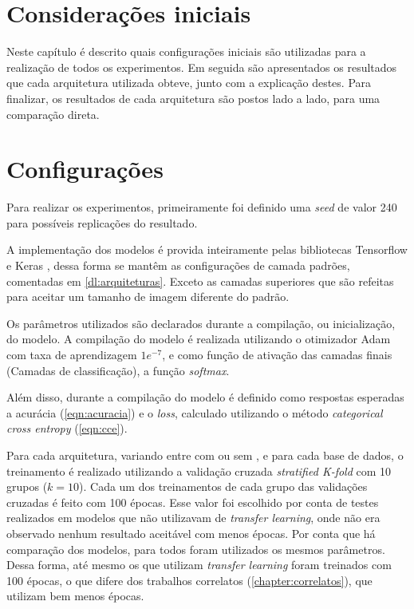 \section{Considerações iniciais}
Neste capítulo é descrito quais configurações iniciais são utilizadas para a realização de todos os experimentos.
Em seguida são apresentados os resultados que cada arquitetura utilizada obteve, junto com a explicação destes.
Para finalizar, os resultados de cada arquitetura são postos lado a lado, para uma comparação direta.

\section{Configurações}
Para realizar os experimentos, primeiramente foi definido uma \textit{seed} de valor 240 para possíveis replicações do resultado.

A implementação dos modelos é provida inteiramente pelas bibliotecas Tensorflow \cite{tensorflow2015-whitepaper} e Keras \cite{chollet2015keras}, dessa forma se mantêm as configurações de camada padrões, comentadas em \autoref{dl:arquiteturas}. 
Exceto as camadas superiores que são refeitas para aceitar um tamanho de imagem diferente do padrão.

Os parâmetros utilizados são declarados durante a compilação, ou inicialização, do modelo.
A compilação do modelo é realizada utilizando o otimizador Adam \cite{kingma2014adam} com taxa de aprendizagem $1e^{-7}$, e como função de ativação das camadas finais (Camadas de classificação), a função \textit{softmax}. 

Além disso, durante a compilação do modelo é definido como respostas esperadas a acurácia (\autoref{eqn:acuracia}) e o \textit{loss}, calculado utilizando o método \textit{categorical cross entropy} (\autoref{eqn:cce}).


Para cada arquitetura, variando entre com ou sem , e para cada base de dados, o treinamento é realizado utilizando a validação cruzada \textit{stratified K-fold} com 10 grupos ($k=10$).
Cada um dos treinamentos de cada grupo das validações cruzadas é feito com 100 épocas.
Esse valor foi escolhido por conta de testes realizados em modelos que não utilizavam de \textit{transfer learning}, onde não era observado nenhum resultado aceitável com menos épocas.
Por conta que há comparação dos modelos, para todos foram utilizados os mesmos parâmetros.
Dessa forma, até mesmo os que utilizam \textit{transfer learning} foram treinados com 100 épocas, o que difere dos trabalhos correlatos (\autoref{chapter:correlatos}), que utilizam bem menos épocas.



